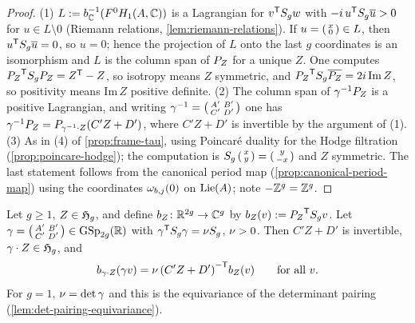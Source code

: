 \begin{proof}
(1) $L := {b}_{\mathbb{C}}^{-1}(F^{0}H_{1}(A,\mathbb{C}))$ is a Lagrangian
for ${v}^{\mathsf{T}}S_{g}w$ with $-i\,{u}^{\mathsf{T}}S_{g}\overline{u} > 0$
for $u \in L\setminus 0$ (Riemann relations, \cref{lem:riemann-relations}).
If $u = \left(\begin{smallmatrix} x \\ 0 \end{smallmatrix}\right) \in L$, then ${u}^{\mathsf{T}}S_{g}\overline{u} = 0$,
so $u = 0$; hence the projection of $L$ onto the last $g$ coordinates is an
isomorphism and $L$ is the column span of $P_{Z}$ for a unique
$Z$. One computes ${P_{Z}}^{\mathsf{T}}S_{g}P_{Z}
= {Z}^{\mathsf{T}} - Z$, so isotropy means $Z$ symmetric, and
${P_{Z}}^{\mathsf{T}}S_{g}\overline{P_{Z}} = 2i\,\mathrm{Im}\,Z$,
so positivity means $\mathrm{Im}\,Z$ positive definite. (2) The column span
of $\gamma^{-1}P_{Z}$ is a positive Lagrangian, and writing
$\gamma^{-1} = \left(\begin{smallmatrix} A' & B' \\ C' & D' \end{smallmatrix}\right)$ one has
$\gamma^{-1}P_{Z} = P_{\gamma^{-1}\cdot Z}(C'Z+D')$, where
$C'Z+D'$ is invertible by the argument of (1). (3) As in (4) of
\cref{prop:frame-tau}, using Poincar\'e duality for the Hodge filtration
(\cref{prop:poincare-hodge}); the computation is
$S_{g}\left(\begin{smallmatrix} x \\ y \end{smallmatrix}\right) = \left(\begin{smallmatrix} y \\ -x \end{smallmatrix}\right)$ and $Z$ symmetric.
The last statement follows from the canonical period map
(\cref{prop:canonical-period-map}) using the coordinates
$\omega_{b,j}(0)$ on $\mathrm{Lie}(A)$; note
$-\mathbb{Z}^{g} = \mathbb{Z}^{g}$.
\end{proof}

\begin{lemma}\label{lem:siegel-equivariance}
Let $g \geq 1$, $Z \in \mathfrak{H}_{g}$, and define
$b_{Z} \colon \mathbb{R}^{2g} \to \mathbb{C}^{g}$ by
$b_{Z}(v) := {P_{Z}}^{\mathsf{T}}S_{g}v$. Let
$\gamma = \smallMat{A'}{B'}{C'}{D'} \in \GSp{2g}{\RR}$ with
${\gamma}^{\mathsf{T}}S_{g}\gamma = \nu S_{g}$,
$\nu > 0$. Then $C'Z+D'$ is invertible, $\gamma\cdot Z \in
\mathfrak{H}_{g}$, and
\[
  b_{\gamma\cdot Z}(\gamma v) =
  \nu\,{(C'Z+D')}^{-\mathsf{T}}b_{Z}(v)
  \qquad\text{for all } v .
\]
For $g = 1$, $\nu = \det\gamma$ and this is the equivariance
of the determinant pairing (\cref{lem:det-pairing-equivariance}).
\end{lemma}

